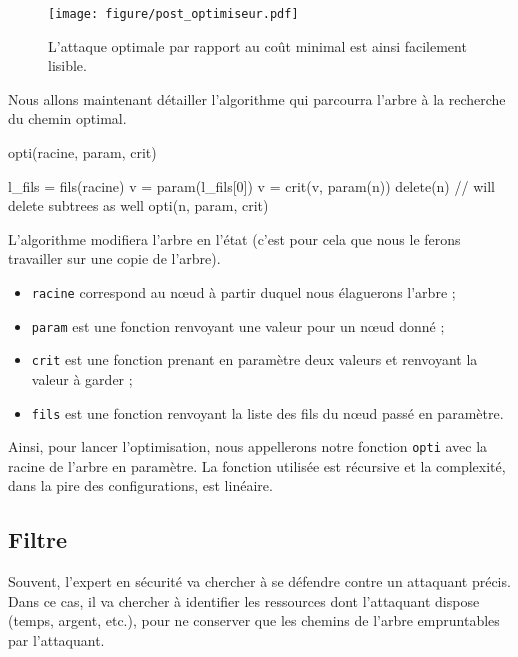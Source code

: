 		\begin{figure}[h!]
			\centering
			\texttt{[image: figure/post\_optimiseur.pdf]}
			\caption{L'attaque optimale par rapport au coût minimal est ainsi facilement lisible.}
			\label{fig:arbre_post_opti}
		\end{figure}
	
		Nous allons maintenant détailler l'algorithme qui parcourra l'arbre à la recherche du chemin optimal.
		\begin{algorithm}[h!]
			\caption{opti(racine, param, crit)}
			\begin{algorithmic}
				\STATE l\_fils = fils(racine)
					\RETURN
				\ENDIF
					\STATE v = param(l\_fils[0])
						\STATE v = crit(v, param(n))
					\ENDFOR
							\STATE delete(n) // will delete subtrees as well
						\ENDIF
					\ENDFOR
				\ENDIF
					\STATE opti(n, param, crit)
				\ENDFOR
			\end{algorithmic}
		\end{algorithm}

		L'algorithme modifiera l'arbre en l'état (c'est pour cela que nous le ferons travailler sur une copie de l'arbre).
		\begin{itemize}
			\item \verb|racine| correspond au nœud à partir duquel nous élaguerons l'arbre ;
			\item \verb|param| est une fonction renvoyant une valeur pour un nœud donné ;
			\item \verb|crit| est une fonction prenant en paramètre deux valeurs et renvoyant la valeur à \og garder \fg{} ;
			\item \verb|fils| est une fonction renvoyant la liste des fils du nœud passé en paramètre.
		\end{itemize}

		Ainsi, pour lancer l'optimisation, nous appellerons notre fonction \verb|opti| avec la racine de l'arbre en paramètre. La fonction utilisée est récursive et la complexité, dans la pire des configurations, est linéaire.

	\subsection{Filtre}
		\label{subsection:filtre} 

		Souvent, l'expert en sécurité va chercher à se défendre contre un attaquant précis. Dans ce cas, il va chercher à identifier les ressources dont l'attaquant dispose (temps, argent, etc.), pour ne conserver que les chemins de l'arbre empruntables par l'attaquant.

